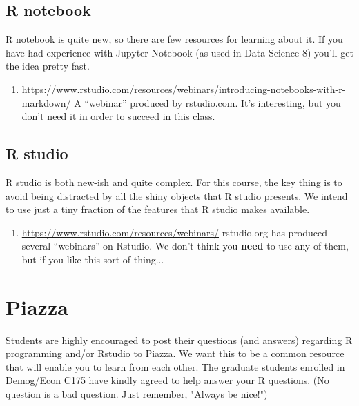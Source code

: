 \documentclass[11pt]{article}
\begin{document}
\subsection{R notebook}
\label{sec:Rnote}

R notebook is quite new, so there are few resources for learning about it. If you have had experience with Jupyter Notebook (as used in Data Science 8) you'll get the idea pretty fast. 
\begin{enumerate}
\item \url{https://www.rstudio.com/resources/webinars/introducing-notebooks-with-r-markdown/} A ``webinar'' produced by rstudio.com.  It's interesting, but you don't need it in order to succeed in this class.
\end{enumerate}

\subsection{R studio}
\label{sec:Rstud}

R studio is both new-ish and quite complex. For this course, the key thing is to avoid being distracted by all the shiny objects that R studio presents.  We intend to use just a tiny fraction of the features that R studio makes available.
\begin{enumerate}
\item \url{https://www.rstudio.com/resources/webinars/} rstudio.org has produced several ``webinars'' on Rstudio.  We don't think you \textbf{need} to  use any of them, but if you like this sort of thing...
\end{enumerate}

\section{Piazza}
\label{sec:piazza}

Students are highly encouraged to post their questions (and answers)
regarding R programming and/or Rstudio to Piazza. We want this to be a common
resource that will enable you to learn from each other. The graduate
students enrolled in Demog/Econ C175 have kindly agreed to help answer your R
questions. (No question is a bad question. Just remember, "Always be
nice!")
\end{document}
